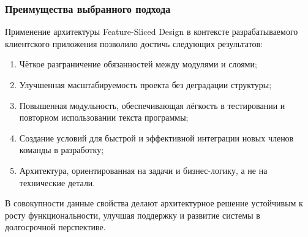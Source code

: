 \subsubsection*{Преимущества выбранного подхода}

Применение архитектуры Feature-Sliced Design в контексте разрабатываемого клиентского приложения позволило достичь следующих результатов:
\begin{enumerate}
  \item Чёткое разграничение обязанностей между модулями и слоями;
  \item Улучшенная масштабируемость проекта без деградации структуры;
  \item Повышенная модульность, обеспечивающая лёгкость в тестировании и повторном использовании текста программы;
  \item Создание условий для быстрой и эффективной интеграции новых членов команды в разработку;
  \item Архитектура, ориентированная на задачи и бизнес-логику, а не на технические детали.
\end{enumerate}

В совокупности данные свойства делают архитектурное решение устойчивым к росту функциональности, улучшая поддержку и развитие системы в долгосрочной перспективе.